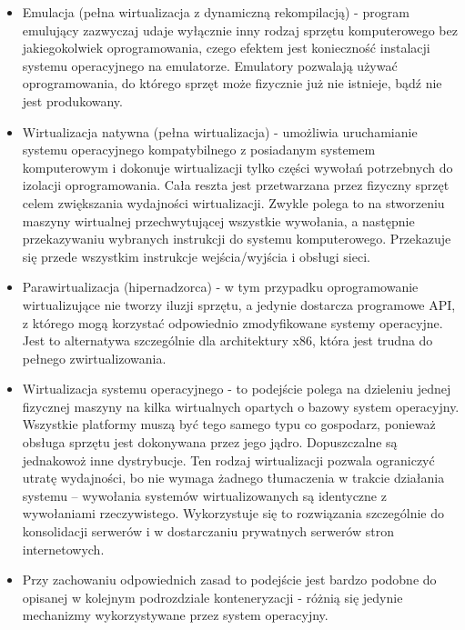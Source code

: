 \documentclass[10pt,a4paper,titlepage,twoside]{report}
\begin{document}
\begin{itemize}
	\item Emulacja (pełna wirtualizacja z dynamiczną rekompilacją) - program emulujący zazwyczaj udaje wyłącznie inny rodzaj sprzętu komputerowego bez jakiegokolwiek oprogramowania, czego efektem jest konieczność instalacji systemu operacyjnego na emulatorze. Emulatory pozwalają używać oprogramowania, do którego sprzęt może fizycznie już nie istnieje, bądź nie jest produkowany.
	\item Wirtualizacja natywna (pełna wirtualizacja) - umożliwia uruchamianie systemu operacyjnego kompatybilnego z posiadanym systemem komputerowym i dokonuje wirtualizacji tylko części wywołań potrzebnych do izolacji oprogramowania. Cała reszta jest przetwarzana przez fizyczny sprzęt celem zwiększania wydajności wirtualizacji. Zwykle polega to na stworzeniu maszyny wirtualnej przechwytującej wszystkie wywołania, a następnie przekazywaniu wybranych instrukcji do systemu komputerowego. Przekazuje się przede wszystkim instrukcje wejścia/wyjścia i obsługi sieci.
	\item Parawirtualizacja (hipernadzorca) - w tym przypadku oprogramowanie wirtualizujące nie tworzy iluzji sprzętu, a jedynie dostarcza programowe API, z którego mogą korzystać odpowiednio zmodyfikowane systemy operacyjne. Jest to alternatywa szczególnie dla architektury x86, która jest trudna do pełnego zwirtualizowania.
	\item Wirtualizacja systemu operacyjnego - to podejście polega na dzieleniu jednej fizycznej maszyny na kilka wirtualnych opartych o bazowy system operacyjny. Wszystkie platformy muszą być tego samego typu co gospodarz, ponieważ obsługa sprzętu jest dokonywana przez jego jądro. Dopuszczalne są jednakowoż inne dystrybucje. Ten rodzaj wirtualizacji pozwala ograniczyć utratę wydajności, bo nie wymaga żadnego tłumaczenia w trakcie działania systemu – wywołania systemów wirtualizowanych są identyczne z wywołaniami rzeczywistego. Wykorzystuje się to rozwiązania szczególnie do konsolidacji serwerów i w dostarczaniu prywatnych serwerów stron internetowych.
	\item Przy zachowaniu odpowiednich zasad to podejście jest bardzo podobne do opisanej w kolejnym podrozdziale konteneryzacji - różnią się jedynie mechanizmy wykorzystywane przez system operacyjny.
\end{itemize}
\end{document}
